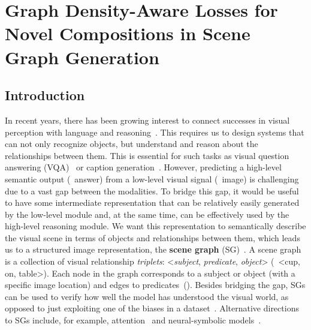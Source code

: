 \graphicspath{{Ch4_2020_bmvc/figs/}}

\chapter{{Graph Density-Aware Losses for Novel Compositions in Scene Graph Generation}\label{ch:bmvc2020}}



\section{Introduction}

In recent years, there has been growing interest to connect successes in visual perception with language and reasoning~\citep{su2019vl,zhou2019unified}. This requires us to design systems that can not only recognize objects, but understand and reason about the relationships between them. 
This is essential for such tasks as visual question answering (VQA)~\citep{antol2015vqa,hudson2019gqa,cangea2019videonavqa} or caption generation~\citep{yang2019auto, gu2019unpaired}. 
However, predicting a high-level semantic output (\eg~answer) from a low-level visual signal (\eg~image) is challenging due to a vast gap between the modalities.
To bridge this gap, it would be useful to have some intermediate representation that can be relatively easily generated by the low-level module and, at the same time, can be effectively used by the high-level reasoning module.
We want this representation to semantically describe the visual scene in terms of objects and relationships between them, which leads us to a structured image representation, the \textbf{scene graph} (SG)~\citep{johnson2015image, Krishna_2017}.
A scene graph is a collection of visual relationship \textit{triplets}: <\textit{subject}, \textit{predicate}, \textit{object}> (\eg~<cup, on, table>). Each node in the graph corresponds to a subject or object (with a specific image location) and edges to predicates~(\fig{\ref{fig:overview}}). 
Besides bridging the gap, SGs can be used to verify how well the model has understood the visual world, as opposed to just exploiting one of the biases in a dataset~\citep{jabri2016revisiting,anand2018blindfold,bahdanau2018systematic}.
Alternative directions to SGs include, for example, attention~\citep{norcliffe2018learning} and neural-symbolic models~\citep{vedantam2019probabilistic}.

